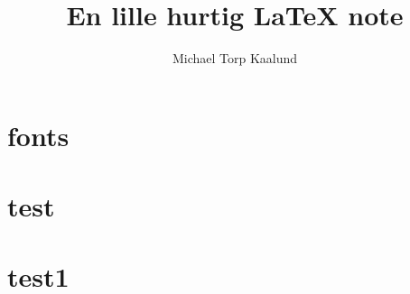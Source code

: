 \documentclass[10pt,a4paper]{report}
\title{En lille hurtig \LaTeX{} note}
\author{Michael Torp Kaalund}
\begin{document}
    \begin{titlepage}
        \maketitle
    \end{titlepage}


    \tableofcontents

    \chapter{fonts}
    
    
    
    
    
    
    
    
    
    
    
    
    
    
    
    
    
    
    
    
    

    \appendix
    \chapter{test}

    \chapter{test1}

    
\end{document}
